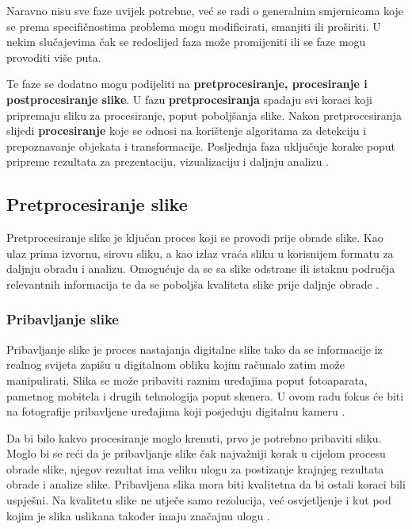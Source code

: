 \documentclass{foi}
\begin{document}
Naravno nisu sve faze uvijek potrebne, već se radi o generalnim smjernicama koje se prema specifičnostima problema mogu modificirati, smanjiti ili proširiti. U nekim slučajevima čak se redoslijed faza može promijeniti ili se faze mogu provoditi više puta.    

Te faze se dodatno mogu podijeliti na \textbf{pretprocesiranje, procesiranje i postprocesiranje slike}. U fazu \textbf{pretprocesiranja} spadaju svi koraci koji pripremaju sliku za procesiranje, poput poboljšanja slike. Nakon pretprocesiranja slijedi \textbf{procesiranje} koje se odnosi na korištenje algoritama za detekciju i prepoznavanje objekata i transformacije. Posljednja faza uključuje korake poput pripreme rezultata za prezentaciju, vizualizaciju i daljnju analizu \cite{IamgeProcesingPhases}.

\pagebreak
\subsection{Pretprocesiranje slike}

Pretprocesiranje slike je ključan proces koji se provodi prije obrade slike. Kao ulaz prima izvornu, sirovu sliku, a kao izlaz vraća sliku u korisnijem formatu za daljnju obradu i analizu. Omogućuje da se sa slike odstrane ili istaknu područja relevantnih informacija te da se poboljša kvaliteta slike prije daljnje obrade \cite{Patel2023Oct}.

\subsubsection{Pribavljanje slike}

Pribavljanje slike je proces nastajanja digitalne slike tako da se informacije iz realnog svijeta zapišu u digitalnom obliku kojim računalo zatim može manipulirati. Slika se može pribaviti raznim uređajima poput fotoaparata, pametnog mobitela i drugih tehnologija poput skenera. U ovom radu fokus će biti na fotografije pribavljene uređajima koji posjeduju digitalnu kameru \cite{BibEntry2025Apr}.


Da bi bilo kakvo procesiranje moglo krenuti, prvo je potrebno pribaviti sliku. Moglo bi se reći da je pribavljanje slike čak najvažniji korak u cijelom procesu obrade slike, njegov rezultat ima veliku ulogu za postizanje krajnjeg rezultata obrade i analize slike. Pribavljena slika mora biti kvalitetna da bi ostali koraci bili uspješni. Na kvalitetu slike ne utječe samo rezolucija, već osvjetljenje i kut pod kojim je slika uslikana također imaju značajnu ulogu \cite{BibEntry2025Apr}.
\end{document}
